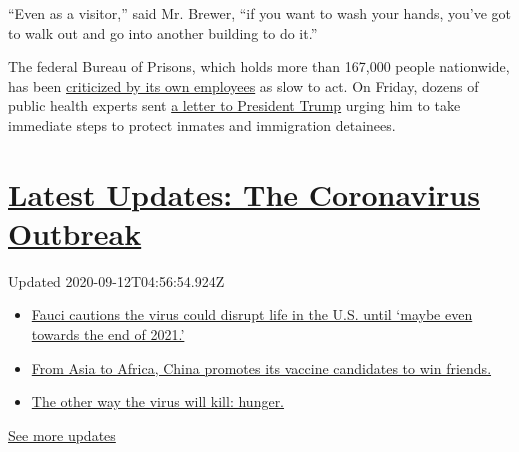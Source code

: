 ``Even as a visitor,'' said Mr. Brewer, ``if you want to wash your
hands, you've got to walk out and go into another building to do it.''

The federal Bureau of Prisons, which holds more than 167,000 people
nationwide, has been
\href{https://www.nytimes3xbfgragh.onion/2020/03/17/us/coronavirus-prisons-jails.html}{criticized
by its own employees} as slow to act. On Friday, dozens of public health
experts sent
\href{http://cc02ecee5db373bb7786bdefac192d4d.tinyemails.com/e78d3422d85eb84b7cff02150575d76b/7b846f644a7a205b01acbef16e9cf51d.html}{a
letter to President Trump} urging him to take immediate steps to protect
inmates and immigration detainees.

\hypertarget{latest-updates-the-coronavirus-outbreak}{%
\section{\texorpdfstring{\href{https://www.nytimes3xbfgragh.onion/2020/09/11/world/covid-19-coronavirus.html?action=click\&pgtype=Article\&state=default\&region=MAIN_CONTENT_1\&context=storylines_live_updates}{Latest
Updates: The Coronavirus
Outbreak}}{Latest Updates: The Coronavirus Outbreak}}\label{latest-updates-the-coronavirus-outbreak}}

Updated 2020-09-12T04:56:54.924Z

\begin{itemize}
\tightlist
\item
  \href{https://www.nytimes3xbfgragh.onion/2020/09/11/world/covid-19-coronavirus.html?action=click\&pgtype=Article\&state=default\&region=MAIN_CONTENT_1\&context=storylines_live_updates\#link-dfb8a16}{Fauci
  cautions the virus could disrupt life in the U.S. until `maybe even
  towards the end of 2021.'}
\item
  \href{https://www.nytimes3xbfgragh.onion/2020/09/11/world/covid-19-coronavirus.html?action=click\&pgtype=Article\&state=default\&region=MAIN_CONTENT_1\&context=storylines_live_updates\#link-7104d154}{From
  Asia to Africa, China promotes its vaccine candidates to win friends.}
\item
  \href{https://www.nytimes3xbfgragh.onion/2020/09/11/world/covid-19-coronavirus.html?action=click\&pgtype=Article\&state=default\&region=MAIN_CONTENT_1\&context=storylines_live_updates\#link-393ad215}{The
  other way the virus will kill: hunger.}
\end{itemize}

\href{https://www.nytimes3xbfgragh.onion/2020/09/11/world/covid-19-coronavirus.html?action=click\&pgtype=Article\&state=default\&region=MAIN_CONTENT_1\&context=storylines_live_updates}{See
more updates}

